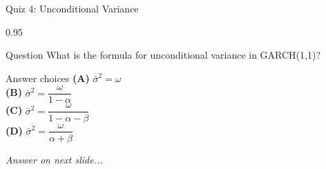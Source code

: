 \documentclass[9pt, aspectratio=169, t]{beamer}
\begin{document}
\begin{frame}{Quiz 4: Unconditional Variance}
    \begin{cminipage}{0.95\textwidth}
    \begin{alertblock}{Question}
        What is the formula for unconditional variance in GARCH(1,1)?
    \end{alertblock}

    \vspace{0.4cm}

    \begin{block}{Answer choices}
        \textcolor{MainBlue}{\textbf{(A)}} $\bar{\sigma}^2 = \omega$\\[3pt]
        \textcolor{MainBlue}{\textbf{(B)}} $\bar{\sigma}^2 = \dfrac{\omega}{1 - \alpha}$\\[3pt]
        \textcolor{MainBlue}{\textbf{(C)}} $\bar{\sigma}^2 = \dfrac{\omega}{1 - \alpha - \beta}$\\[3pt]
        \textcolor{MainBlue}{\textbf{(D)}} $\bar{\sigma}^2 = \dfrac{\omega}{\alpha + \beta}$
    \end{block}

    \vspace{0.5cm}

    \begin{center}
        \textit{Answer on next slide...}
    \end{center}
    \end{cminipage}
\end{frame}
\end{document}
